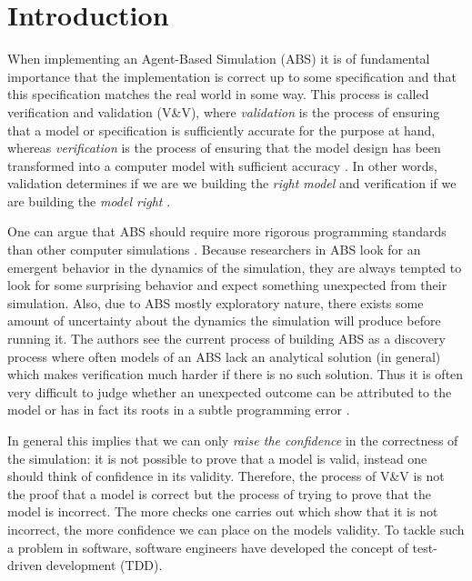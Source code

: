 \section{Introduction}
When implementing an Agent-Based Simulation (ABS) it is of fundamental importance that the implementation is correct up to some specification and that this specification matches the real world in some way. This process is called verification and validation (V\&V), where \textit{validation} is the process of ensuring that a model or specification is sufficiently accurate for the purpose at hand, whereas \textit{verification} is the process of ensuring that the model design has been transformed into a computer model with sufficient accuracy \cite{robinson_simulation:_2014}. In other words, validation determines if we are we building the \textit{right model} and verification if we are building the \textit{model right} \cite{balci_verification_1998}.

One can argue that ABS should require more rigorous programming standards than other computer simulations \cite{polhill_ghost_2005}. Because researchers in ABS look for an emergent behavior in the dynamics of the simulation, they are always tempted to look for some surprising behavior and expect something unexpected from their simulation. 
Also, due to ABS mostly exploratory nature, there exists some amount of uncertainty about the dynamics the simulation will produce before running it. The authors  see the current process of building ABS as a discovery process where often models of an ABS lack an analytical solution (in general) which makes verification much harder if there is no such solution. Thus it is often very difficult to judge whether an unexpected outcome can be attributed to the model or has in fact its roots in a subtle programming error .

In general this implies that we can only \textit{raise the confidence} in the correctness of the simulation: it is not possible to prove that a model is valid, instead one should think of confidence in its validity. Therefore, the process of V\&V is not the proof that a model is correct but the process of trying to prove that the model is incorrect. The more checks one carries out which show that it is not incorrect, the more confidence we can place on the models validity. To tackle such a problem in software, software engineers have developed the concept of test-driven development (TDD).

